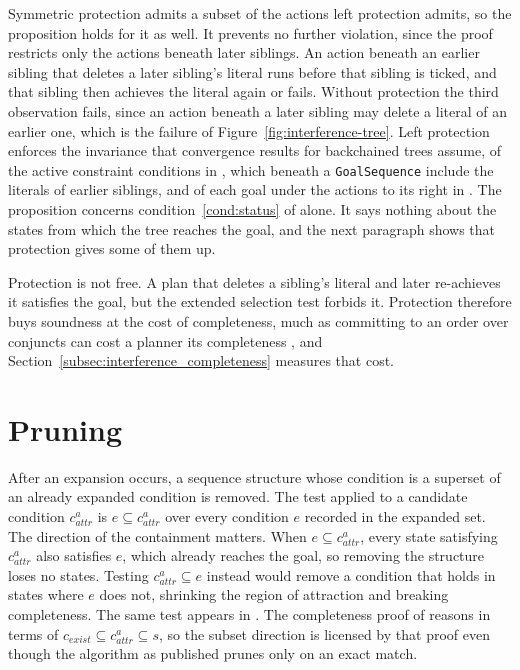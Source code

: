     Symmetric protection admits a subset of the actions left protection admits, so the proposition holds for it as well.
    It prevents no further violation, since the proof restricts only the actions beneath later siblings.
    An action beneath an earlier sibling that deletes a later sibling's literal runs before that sibling is ticked, and that sibling then achieves the literal again or fails.
    Without protection the third observation fails, since an action beneath a later sibling may delete a literal of an earlier one, which is the failure of Figure~\ref{fig:interference-tree}.
    Left protection enforces the invariance that convergence results for backchained trees assume, of the active constraint conditions in \cite{ogren2020}, which beneath a \texttt{GoalSequence} include the literals of earlier siblings, and of each goal under the actions to its right in \cite{ozkahraman2020}.
    The proposition concerns condition~\ref{cond:status} of \probprime alone.
    It says nothing about the states from which the tree reaches the goal, and the next paragraph shows that protection gives some of them up.

    Protection is not free.
    A plan that deletes a sibling's literal and later re-achieves it satisfies the goal, but the extended selection test forbids it.
    Protection therefore buys soundness at the cost of completeness, much as committing to an order over conjuncts can cost a planner its completeness \cite{koehler2000}, and Section~\ref{subsec:interference_completeness} measures that cost.

\section{Pruning}
\label{sec:pruning}
    \label{subsec:pruning_definition}
    After an expansion occurs, a sequence structure whose condition is a superset of an already expanded condition is removed.
    The test applied to a candidate condition $c^a_{attr}$ is $e \subseteq c^a_{attr}$ over every condition $e$ recorded in the expanded set.
    The direction of the containment matters.
    When $e \subseteq c^a_{attr}$, every state satisfying $c^a_{attr}$ also satisfies $e$, which already reaches the goal, so removing the structure loses no states.
    Testing $c^a_{attr} \subseteq e$ instead would remove a condition that holds in states where $e$ does not, shrinking the region of attraction and breaking completeness.
    The same test appears in \cite{chen2024}.
    The completeness proof of \cite{cai2021} reasons in terms of $c_{exist} \subseteq c^a_{attr} \subseteq s$, so the subset direction is licensed by that proof even though the algorithm as published prunes only on an exact match.
 
